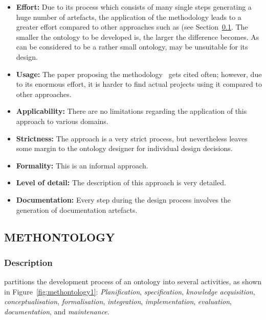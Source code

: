 \begin{itemize}
  \item \textbf{Effort:} Due to its process which consists of many single steps generating a huge number of artefacts, the application of the  methodology leads to a greater effort compared to other approaches such as \methontology (see Section~\ref{subsec:approach5}. The smaller the ontology to be developed is, the larger the difference becomes. As \smarthomeweather can be considered to be a rather small ontology,  may be unsuitable for its design.
  
   \item \textbf{Usage:} The paper proposing the  methodology~\cite{SoftwareEngineeringOntology} gets cited often; however, due to its enormous effort, it is harder to find actual projects using it compared to other approaches.

  \item \textbf{Applicability:} There are no limitations regarding the application of this approach to various domains.
  
  \item \textbf{Strictness:} The  approach is a very strict process, but nevertheless leaves some margin to the ontology designer for individual design decisions.
  
  \item \textbf{Formality:} This is an informal approach.
  
  \item \textbf{Level of detail:} The description of this approach is very detailed.
  
  \item \textbf{Documentation:} Every step during the design process involves the generation of documentation artefacts.
\end{itemize}

\subsection{METHONTOLOGY}
\label{subsec:approach5}

\subsubsection{Description}

\methontology partitions the development process of an ontology into several activities, as shown in Figure~\ref{fig:methontology1}: \emph{Planification}, \emph{specification}, \emph{knowledge acquisition}, \emph{conceptualisation}, \emph{formalisation}, \emph{integration}, \emph{implementation}, \emph{evaluation}, \emph{documentation}, and \emph{maintenance}.

